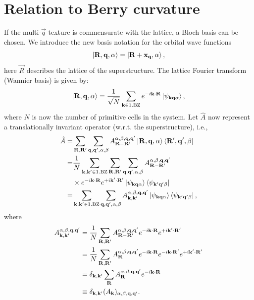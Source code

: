 \documentclass[
    10pt,
    aps,
    prb,
	longbibliography,
    twocolumn,
    floatfix,
    superscriptaddress,
]{revtex4-2}
\begin{document}
\section{Relation to Berry curvature}
\label{app:berry_curvature}

If the multi-$\vec{q}$ texture is commensurate with the lattice, a Bloch basis can be chosen.
We introduce the new basis notation for the orbital wave functions
\begin{equation}
	\ket{\vec{R}, \vec{q}, \alpha} = \ket{\vec{R}+\vec{x}_{\vec{q}}, \alpha} ,
\end{equation}
here $\vec{R}$ describes the lattice of the superstructure.
The lattice Fourier transform (Wannier basis) is given by:
\begin{equation}
	\ket{\vec{R}, \vec{q}, \alpha} = \frac{1}{\sqrt{N}}
	\sum_{\vec{k} \in \mathrm{1. BZ}} e^{-i \vec{k}\cdot\vec{R}} 
	\ket{\psi_{\vec{k} \vec{q} \alpha}},
\end{equation}
where $N$ is now the number of primitive cells in the system.
Let $\hat{A}$ now represent a translationally invariant operator (w.r.t. the superstructure), i.e.,
\begin{align}
	\hat{A}  = &\sum_{\vec{R}, \vec{R}'} \sum_{\vec{q}, \vec{q}' , \alpha, \beta}
	A_{\vec{R}-\vec{R}'}^{ \alpha, \beta, \vec{q}, \vec{q}'} \ket{\vec{R}, \vec{q}, \alpha} \bra{\vec{R}',\vec{q}', \beta}
	\notag \\
	=& \frac{1}{N} \sum_{\vec{k}, \vec{k}' \in \mathrm{1. BZ}}
	\sum_{\vec{R}, \vec{R}'} \sum_{\vec{q}, \vec{q}' , \alpha, \beta}
	A_{\vec{R}-\vec{R}'}^{ \alpha, \beta, \vec{q}, \vec{q}'} 
    \notag \\ & \times
	e^{-i \vec{k}\cdot\vec{R}} 
	e^{+i \vec{k}'\cdot\vec{R}'} 
	\ket{\psi_{\vec{k} \vec{q} \alpha}} \bra{\psi_{\vec{k}' \vec{q}' \beta}}
	\notag \\
	= & \sum_{\vec{k}, \vec{k}' \in \mathrm{1. BZ}}
	 \sum_{\vec{q}, \vec{q}' , \alpha, \beta}
	A_{\vec{k}, \vec{k}'}^{ \alpha, \beta, \vec{q}, \vec{q}'} 
	\ket{\psi_{\vec{k} \vec{q} \alpha}} \bra{\psi_{\vec{k}' \vec{q}' \beta}},
\end{align}
where 
\begin{align}
	A_{\vec{k}, \vec{k}'}^{ \alpha, \beta, \vec{q}, \vec{q}'} 
	& =  \frac{1}{N}
	\sum_{\vec{R}, \vec{R}'}A_{\vec{R}-\vec{R}'}^{ \alpha, \beta, \vec{q}, \vec{q}'} 
	e^{-i \vec{k}\cdot\vec{R}} 
	e^{+i \vec{k}'\cdot\vec{R}'} 
	\notag \\
	& =  \frac{1}{N}
	\sum_{\vec{R}, \vec{R}'}A_{\vec{R}}^{ \alpha, \beta, \vec{q}, \vec{q}'} 
	e^{-i \vec{k}\cdot\vec{R}} 
	e^{-i \vec{k}\cdot\vec{R}'} 
	e^{+i \vec{k}'\cdot\vec{R}'} 
	\notag \\
	& =   \delta_{\vec{k}, \vec{k}'}
	\sum_{\vec{R}}A_{\vec{R}}^{ \alpha, \beta, \vec{q}, \vec{q}'} 
	e^{-i \vec{k}\cdot\vec{R}} 
	\notag \\
	& \equiv   \delta_{\vec{k}, \vec{k}'}
	(A_{\vec{k}})_{ \alpha, \beta, \vec{q}, \vec{q}'} .
\end{align}
\end{document}
